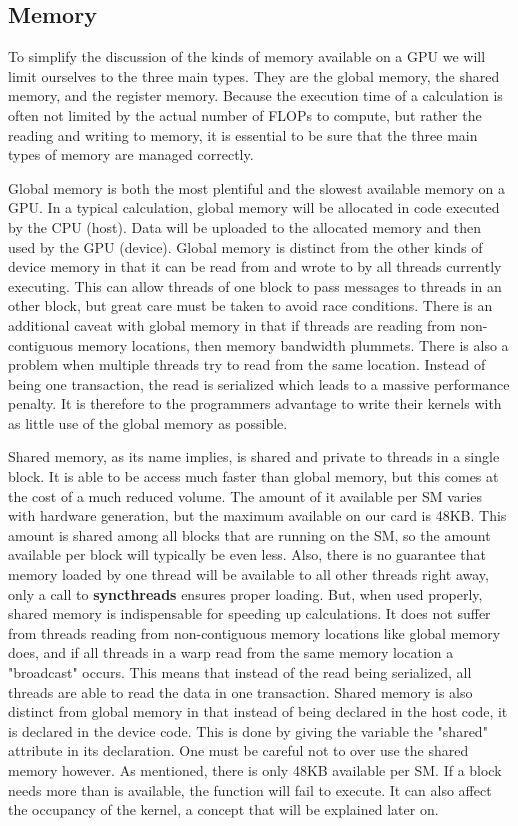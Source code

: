 \documentclass[12pt]{report}
\newcommand{\comm}[1]{\textbf{#1}}
\begin{document}
\subsection{Memory}
\label{sec:gpumem}
To simplify the discussion of the kinds of memory available on a GPU we will limit ourselves to the three main types. They are the global memory, the shared memory, and the register memory. Because the execution time of a calculation is often not limited by the actual number of FLOPs to compute, but rather the reading and writing to memory, it is essential to be sure that the three main types of memory are managed correctly.

Global memory is both the most plentiful and the slowest available memory on a GPU. In a typical calculation, global memory will be allocated in code executed by the CPU (host). Data will be uploaded to the allocated memory and then used by the GPU (device). Global memory is distinct from the other kinds of device memory in that it can be read from and wrote to by all threads currently executing. This can allow threads of one block to pass messages to threads in an other block, but great care must be taken to avoid race conditions. There is an additional caveat with global memory in that if threads are reading from non-contiguous memory locations, then memory bandwidth plummets. There is also a problem when multiple threads try to read from the same location. Instead of being one transaction, the read is serialized which leads to a massive performance penalty. It is therefore to the programmers advantage to write their kernels with as little use of the global memory as possible.

Shared memory, as its name implies, is shared and private to threads in a single block. It is able to be access much faster than global memory, but this comes at the cost of a much reduced volume. The amount of it available per SM varies with hardware generation, but the maximum available on our card is 48KB. This amount is shared among all blocks that are running on the SM, so the amount available per block will typically be even less. Also, there is no guarantee that memory loaded by one thread will be available to all other threads right away, only a call to \comm{syncthreads} ensures proper loading. But, when used properly, shared memory is indispensable for speeding up calculations. It does not suffer from threads reading from non-contiguous memory locations like global memory does, and if all threads in a warp read from the same memory location a "broadcast" occurs. This means that instead of the read being serialized, all threads are able to read the data in one transaction. Shared memory is also distinct from global memory in that instead of being declared in the host code, it is declared in the device code. This is done by giving the variable the "shared" attribute in its declaration. One must be careful not to over use the shared memory however. As mentioned, there is only 48KB available per SM. If a block needs more than is available, the function will fail to execute. It can also affect the occupancy of the kernel, a concept that will be explained later on.
\end{document}
